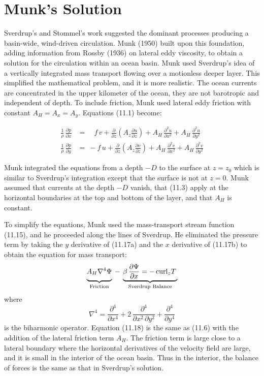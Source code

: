 \section{Munk's Solution}
Sverdrup's and Stommel's work suggested the
dominant processes producing a basin-wide, wind-driven
circulation. Munk (1950) built upon this foundation, adding
information from Rossby (1936) on lateral eddy viscosity, to obtain a
solution for the circulation within an ocean basin. Munk used
Sverdrup's idea of a vertically integrated mass transport flowing over
a motionless deeper layer. This simplified the mathematical problem,
and it is more realistic. The ocean currents are concentrated in the
upper kilometer of the ocean, they are not barotropic and independent
of depth. To include friction, Munk used lateral eddy friction with
constant $A_H = A_x = A_y$. Equations (11.1) become:

\begin{subequations}
\begin{align}
\frac{1}{\rho}\, \frac{\partial{p}}{\partial{x}}
&=\quad f \,v+\frac{\partial}{\partial{z}}\left(A_z
\frac{\partial{u}}{\partial{z}}\right) + A_H\,
\frac{\partial^2{u}}{\partial{x}^2} + A_H\, \frac{\partial^2{u}}{\partial{y}^2} \\
\frac{1}{\rho}\, \frac{\partial{p}}{\partial{y}} &=\:-f \,u+\frac{\partial}{\partial{z}}\left(A_z
\frac{\partial{v}}{\partial{z}}\right) + A_H\, \frac{\partial^2{v}}{\partial{x}^2} + A_H\,
\frac{\partial^2{v}}{\partial{y}^2}
\end{align}
\end{subequations}

Munk integrated the equations from a depth $-D$ to the surface at
$z = z_0$ which is similar to Sverdrup's integration except that the
surface is not at $z = 0$.  Munk assumed that currents at the depth
$-D$ vanish, that (11.3) apply at the horizontal boundaries at the top
and bottom of the layer, and that $A_H$ is constant.

To simplify the equations, Munk used the mass-transport stream
function (11.15), and he proceeded
along the lines of Sverdrup. He eliminated the pressure term by taking
the $y$ derivative of (11.17a) and the $x$ derivative of (11.17b) to
obtain the equation for mass transport:
\begin{equation}
\underbrace{A_H \nabla^{4}
\Psi\vphantom{\frac{\partial\Psi}{\partial{x}}}}_{\text{Friction}}\:-\:\underbrace{\beta\,\frac{\partial\Psi}{\partial{x}} =-\,\text{curl}_z T
\,}_{\text{Sverdrup Balance}}
\end{equation}
where
\begin{equation}
\nabla^4 =\frac{\partial^4}{\partial{x}^4}+2\,\frac{\partial^4}{\partial{x}^2
\,\partial{y}^2} + \frac{\partial^4}{\partial{y}^4}
\end{equation}
is the biharmonic operator. Equation (11.18) is the same as (11.6)
with the addition of the lateral friction term $A_H$. The friction
term is large close to a lateral boundary where the horizontal
derivatives of the velocity field are large, and it is small in the
interior of the ocean basin. Thus in the interior, the balance of
forces is the same as that in Sverdrup's solution.

